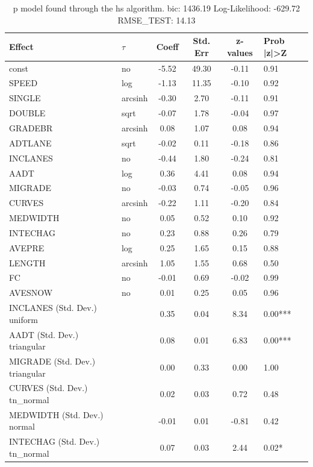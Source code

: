 \begin{table}
	\caption{p model found through the hs algorithm. bic: 1436.19 Log-Likelihood: -629.72 RMSE_TEST: 14.13}
	\begin{center}
		\begin{tabular}{|l|l|c|c|c|l|}
			\hline
			Effect & $\tau$ & Coeff & Std. Err & z-values & Prob |z|>Z \\
			\hline
			const & no & -5.52 & 49.30 & -0.11 & 0.91 \\
			\hline
			SPEED & log & -1.13 & 11.35 & -0.10 & 0.92 \\
			\hline
			SINGLE & arcsinh & -0.30 & 2.70 & -0.11 & 0.91 \\
			\hline
			DOUBLE & sqrt & -0.07 & 1.78 & -0.04 & 0.97 \\
			\hline
			GRADEBR & arcsinh & 0.08 & 1.07 & 0.08 & 0.94 \\
			\hline
			ADTLANE & sqrt & -0.02 & 0.11 & -0.18 & 0.86 \\
			\hline
			INCLANES & no & -0.44 & 1.80 & -0.24 & 0.81 \\
			\hline
			AADT & log & 0.36 & 4.41 & 0.08 & 0.94 \\
			\hline
			MIGRADE & no & -0.03 & 0.74 & -0.05 & 0.96 \\
			\hline
			CURVES & arcsinh & -0.22 & 1.11 & -0.20 & 0.84 \\
			\hline
			MEDWIDTH & no & 0.05 & 0.52 & 0.10 & 0.92 \\
			\hline
			INTECHAG & no & 0.23 & 0.88 & 0.26 & 0.79 \\
			\hline
			AVEPRE & log & 0.25 & 1.65 & 0.15 & 0.88 \\
			\hline
			LENGTH & arcsinh & 1.05 & 1.55 & 0.68 & 0.50 \\
			\hline
			FC & no & -0.01 & 0.69 & -0.02 & 0.99 \\
			\hline
			AVESNOW & no & 0.01 & 0.25 & 0.05 & 0.96 \\
			\hline
			INCLANES (Std. Dev.) uniform &  & 0.35 & 0.04 & 8.34 & 0.00*** \\
			\hline
			AADT (Std. Dev.) triangular &  & 0.08 & 0.01 & 6.83 & 0.00*** \\
			\hline
			MIGRADE (Std. Dev.) triangular &  & 0.00 & 0.33 & 0.00 & 1.00 \\
			\hline
			CURVES (Std. Dev.) tn_normal &  & 0.02 & 0.03 & 0.72 & 0.48 \\
			\hline
			MEDWIDTH (Std. Dev.) normal &  & -0.01 & 0.01 & -0.81 & 0.42 \\
			\hline
			INTECHAG (Std. Dev.) tn_normal &  & 0.07 & 0.03 & 2.44 & 0.02* \\

\end{tabular}
\end{center}
\end{table}
